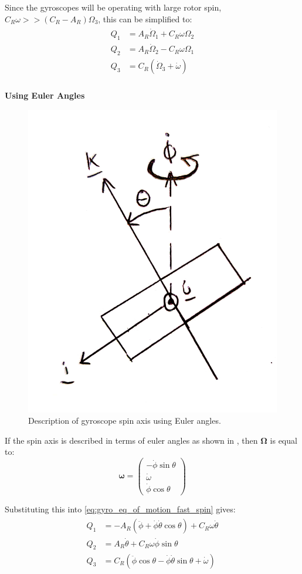 \documentclass[12]{article}
\begin{document}
\begin{multicols*}{2}
Since the gyroscopes will be operating with large rotor spin, $C_R\omega >> (C_R-A_R)\Omega_3$, this can be simplified to:
\begin{align} \label{eq:gyro_eq_of_motion_fast_spin}
\begin{split}
Q_1 &= A_R\dot{\Omega}_1 + C_R\omega\Omega_2 \\
Q_2 &= A_R\dot{\Omega}_2 - C_R\omega\Omega_1 \\
Q_3 &= C_R(\dot{\Omega}_3 + \dot{\omega}) \\
\end{split}
\end{align}

\textbf{Using Euler Angles}

\begin{figure}[H]
\centering
\includegraphics[width=0.6\linewidth]{fig/euler_angles.jpg}
\vspace{-0.3cm}
\caption{\label{fig:euler_angles}Description of gyroscope spin axis using Euler angles.}
\end{figure}

If the spin axis is described in terms of euler angles as shown in , then $\bm{\Omega}$ is equal to:
\begin{equation}
\bm{\omega} =
\begin{pmatrix}
-\dot{\phi}\sin{\theta} \\
\dot{\omega} \\
\dot{\phi}\cos{\theta}
\end{pmatrix}
\end{equation}

Substituting this into \cref{eq:gyro_eq_of_motion_fast_spin} gives:
\begin{align} \label{eq:gyro_eq_of_motion_euler}
\begin{split}
Q_1 &= -A_R(\ddot{\phi} + \dot{\phi}\dot{\theta}\cos\theta) + C_R\omega\dot{\theta} \\
Q_2 &= A_R\dot{\theta} + C_R\omega\dot{\phi}\sin\theta \\
Q_3 &= C_R(\ddot{\phi}\cos\theta - \dot{\phi}\dot{\theta}\sin\theta + \dot{\omega}) \\
\end{split}
\end{align}


\end{multicols*}
\end{document}

